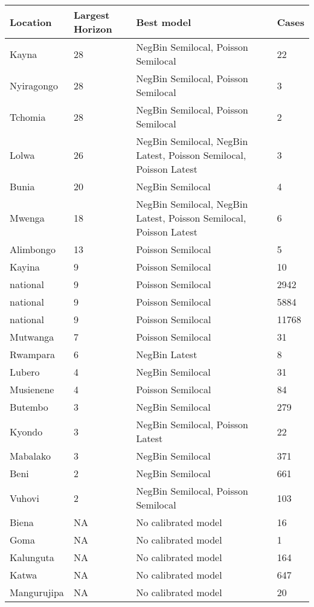 \begin{table}[h!]
\centering
\begin{tabular}{|l|l|p{8cm}|l|}
  \hline
Location & Largest Horizon & Best model & Cases \\ 
  \hline
Kayna & 28 & NegBin Semilocal, Poisson Semilocal & 22 \\ 
  Nyiragongo & 28 & NegBin Semilocal, Poisson Semilocal & 3 \\ 
  Tchomia & 28 & NegBin Semilocal, Poisson Semilocal & 2 \\ 
  Lolwa & 26 & NegBin Semilocal, NegBin Latest, Poisson Semilocal, Poisson Latest & 3 \\ 
  Bunia & 20 & NegBin Semilocal & 4 \\ 
  Mwenga & 18 & NegBin Semilocal, NegBin Latest, Poisson Semilocal, Poisson Latest & 6 \\ 
  Alimbongo & 13 & Poisson Semilocal & 5 \\ 
  Kayina & 9 & Poisson Semilocal & 10 \\ 
  national & 9 & Poisson Semilocal & 2942 \\ 
  national & 9 & Poisson Semilocal & 5884 \\ 
  national & 9 & Poisson Semilocal & 11768 \\ 
  Mutwanga & 7 & Poisson Semilocal & 31 \\ 
  Rwampara & 6 & NegBin Latest & 8 \\ 
  Lubero & 4 & NegBin Semilocal & 31 \\ 
  Musienene & 4 & Poisson Semilocal & 84 \\ 
  Butembo & 3 & NegBin Semilocal & 279 \\ 
  Kyondo & 3 & NegBin Semilocal, Poisson Latest & 22 \\ 
  Mabalako & 3 & NegBin Semilocal & 371 \\ 
  Beni & 2 & NegBin Semilocal & 661 \\ 
  Vuhovi & 2 & NegBin Semilocal, Poisson Semilocal & 103 \\ 
  Biena & NA & No calibrated model & 16 \\ 
  Goma & NA & No calibrated model & 1 \\ 
  Kalunguta & NA & No calibrated model & 164 \\ 
  Katwa & NA & No calibrated model & 647 \\ 
  Mangurujipa & NA & No calibrated model & 20 \\ 

\end{tabular}
\end{table}
